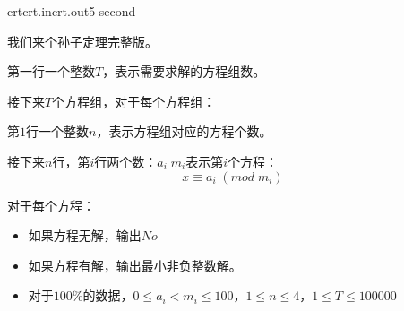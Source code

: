 \documentclass[11pt,a4paper,oneside]{article}
\begin{document}
\begin{problem}{crt}{crt.in}{crt.out}{5 second} 
	
	我们来个孙子定理完整版。
	
	\InputFile
	第一行一个整数$ T $，表示需要求解的方程组数。
	
	接下来$ T $个方程组，对于每个方程组：
	
	第$1$行一个整数$n$，表示方程组对应的方程个数。
	
	接下来$n$行，第$i$行两个数：$a_i \; m_i$表示第$i$个方程：
	$$
		x \equiv a_i \; ( mod \; m_i )
	$$
	
	\OutputFile
	对于每个方程：
	\begin{itemize}
		\item 如果方程无解，输出$No$
		\item 如果方程有解，输出最小非负整数解。
	\end{itemize}
	
	\Example
	
	\begin{example}
\end{example}

\Note

\begin{itemize}
	\item 对于$100\%$的数据，$ 0 \leq a_i < m_i \leq 100 $，$ 1 \leq n \leq 4$，$1 \leq T \leq 100000$
\end{itemize}

\end{problem}
\end{document}
